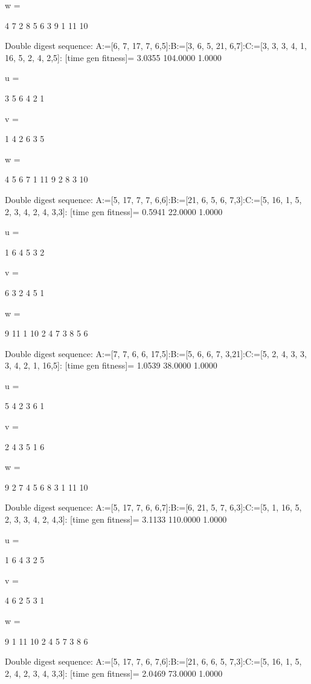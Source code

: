 w =

     4     7     2     8     5     6     3     9     1    11    10

Double digest sequence:
A:=[6, 7, 17, 7, 6,5]:B:=[3, 6, 5, 21, 6,7]:C:=[3, 3, 3, 4, 1, 16, 5, 2, 4, 2,5]:
[time gen fitness]=
    3.0355  104.0000    1.0000


u =

     3     5     6     4     2     1


v =

     1     4     2     6     3     5


w =

     4     5     6     7     1    11     9     2     8     3    10

Double digest sequence:
A:=[5, 17, 7, 7, 6,6]:B:=[21, 6, 5, 6, 7,3]:C:=[5, 16, 1, 5, 2, 3, 4, 2, 4, 3,3]:
[time gen fitness]=
    0.5941   22.0000    1.0000


u =

     1     6     4     5     3     2


v =

     6     3     2     4     5     1


w =

     9    11     1    10     2     4     7     3     8     5     6

Double digest sequence:
A:=[7, 7, 6, 6, 17,5]:B:=[5, 6, 6, 7, 3,21]:C:=[5, 2, 4, 3, 3, 3, 4, 2, 1, 16,5]:
[time gen fitness]=
    1.0539   38.0000    1.0000


u =

     5     4     2     3     6     1


v =

     2     4     3     5     1     6


w =

     9     2     7     4     5     6     8     3     1    11    10

Double digest sequence:
A:=[5, 17, 7, 6, 6,7]:B:=[6, 21, 5, 7, 6,3]:C:=[5, 1, 16, 5, 2, 3, 3, 4, 2, 4,3]:
[time gen fitness]=
    3.1133  110.0000    1.0000


u =

     1     6     4     3     2     5


v =

     4     6     2     5     3     1


w =

     9     1    11    10     2     4     5     7     3     8     6

Double digest sequence:
A:=[5, 17, 7, 6, 7,6]:B:=[21, 6, 6, 5, 7,3]:C:=[5, 16, 1, 5, 2, 4, 2, 3, 4, 3,3]:
[time gen fitness]=
    2.0469   73.0000    1.0000


